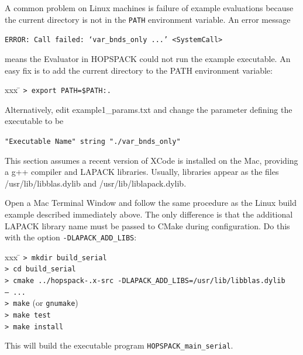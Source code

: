 A common problem on Linux machines is failure of example evaluations because
the current directory is not in the {\tt PATH} environment variable.
An error message

\hspace{0.2in}
{\tt ERROR: Call failed: `var\_bnds\_only ...' <SystemCall>}

\noindent
means the Evaluator in HOPSPACK could not run the example executable.
An easy fix is to add the current directory to the PATH environment variable:
\vspace{-11pt}
\begin{tabbing}
  xxx \= \kill
  \> {\tt > export PATH=\$PATH:.}
\end{tabbing}
\vspace{-11pt}
Alternatively, edit {\sf example1\_params.txt} and change the parameter
defining the executable to be

\hspace{0.2in}
{\tt  "Executable Name" string "./var\_bnds\_only"}


\bigskip
{}
This section assumes a recent version of XCode is installed on the Mac,
providing a g++ compiler and LAPACK libraries.  Usually, libraries
appear as the files {\sf /usr/lib/libblas.dylib}
and {\sf /usr/lib/liblapack.dylib}.

Open a Mac Terminal Window and follow the same procedure as the Linux build
example described immediately above.  The only difference is that the additional
LAPACK library name must be passed to CMake during configuration.  Do this
with the option {\tt -DLAPACK\_ADD\_LIBS}:
\vspace{-11pt}
\begin{tabbing}
  xxx \= \kill
  \> {\tt > mkdir build\_serial} \\
  \> {\tt > cd build\_serial} \\
  \> {\tt > cmake ../hopspack-\HOPSVER.x-src
                  -DLAPACK\_ADD\_LIBS=/usr/lib/libblas.dylib} \\
  \> {\tt -- ...} \\
  \> {\tt > make} (or {\tt gnumake}) \\
  \> {\tt > make test} \\
  \> {\tt > make install}
\end{tabbing}
\vspace{-11pt}
This will build the executable program {\tt HOPSPACK\_main\_serial}.

